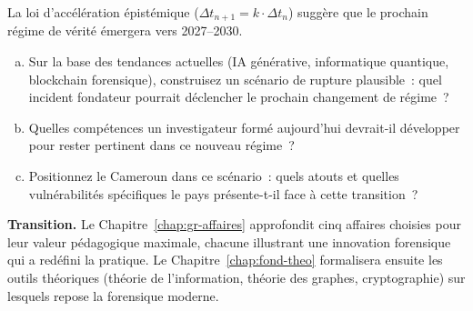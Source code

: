 \begin{boxexo}[title={\ding{45}\quad Exercice~2.3. Prospective \niveauexpert}]
La loi d'accélération épistémique ($\Delta t_{n+1} = k \cdot \Delta t_n$)
suggère que le prochain régime de vérité émergera vers 2027--2030.

\begin{enumerate}[(a)]
    \item Sur la base des tendances actuelles (IA générative, informatique
          quantique, blockchain forensique), construisez un scénario de rupture
          plausible~: quel incident fondateur pourrait déclencher le prochain
          changement de régime~?
    \item Quelles compétences un investigateur formé aujourd'hui devrait-il
          développer pour rester pertinent dans ce nouveau régime~?
    \item Positionnez le Cameroun dans ce scénario~: quels atouts et quelles
          vulnérabilités spécifiques le pays présente-t-il face à cette
          transition~?
\end{enumerate}
\end{boxexo}

\bigskip

\begin{boxinfo}
\textbf{Transition.} Le Chapitre~\ref{chap:gr-affaires} approfondit
cinq affaires choisies pour leur valeur pédagogique maximale, chacune
illustrant une innovation forensique qui a redéfini la pratique. Le
Chapitre~\ref{chap:fond-theo} formalisera ensuite les outils théoriques
(théorie de l'information, théorie des graphes, cryptographie) sur lesquels
repose la forensique moderne.
\end{boxinfo}
